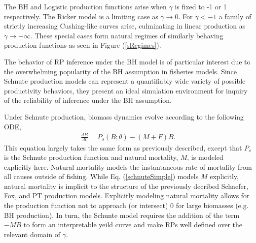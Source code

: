 %
The BH and Logistic production functions arise when $\gamma$ is fixed to -1 or
1 respectively. The Ricker model is a limiting case as $\gamma\rightarrow0$. %
For $\gamma<-1$ a family of strictly increasing Cushing-like curves arise,
culminating in linear production as $\gamma\to-\infty$. These special cases form
natural regimes of similarly behaving production functions as seen in Figure (\ref{sRegimes}).

%
The behavior of RP inference under the BH model is of particular interest due
to the overwhelming popularity of the BH assumption in fisheries models.
Since Schnute production models can represent a quantifiably wide variety
of possible productivity behaviors, they present an ideal simulation
environment for inquiry of the reliability of inference under the BH
assumption.


%
Under Schnute production, biomass dynamics evolve according to the following ODE,
%
\begin{align}
\frac{dB}{dt} = P_s(B;\theta) - (M+F)B. \label{schnuteSimple}
\end{align}
%
This equation largely takes the same form as previously described, except
that $P_s$ is the Schnute production function and natural mortality, $M$, is modeled
explicitly here. %
Natural mortality models the instantaneous rate of mortality from all causes
outside of fishing. While Eq. (\ref{schnuteSimple}) models $M$ explicitly,
natural mortality is implicit to the structure of the previously decribed
Schaefer, Fox, and PT production models. Explicitly modeling natural mortality
allows for the production function not to approach (or intersect) 0 for large
biomasses (e.g. BH production). In turn, the Schunte model requires the addition
of the term $-MB$ to form an interpretable yeild curve and make RPs well defined
over the relevant domain of $\gamma$.


